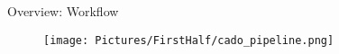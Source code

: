 \begin{frame}{Overview: Workflow}

\begin{figure}
\centering
\texttt{[image: Pictures/FirstHalf/cado\_pipeline.png]}
\end{figure}

\end{frame}
